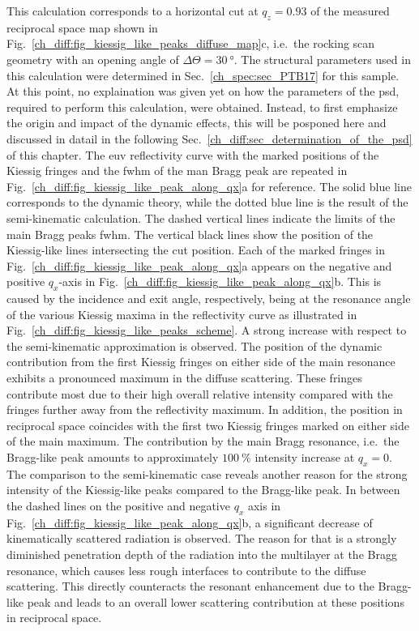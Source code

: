 This calculation corresponds to a horizontal cut at $q_z=0.93$ of the measured reciprocal space map shown in Fig.~\ref{ch_diff:fig_kiessig_like_peaks_diffuse_map}c, i.e.~the rocking scan geometry with an opening angle of $\Delta \Theta = \SI{30}{\degree}$. The structural parameters used in this calculation were determined in Sec.~\ref{ch_spec:sec_PTB17} for this sample. At this point, no explaination was given yet on how the parameters of the \gls{psd}, required to perform this calculation, were obtained. Instead, to first emphasize the origin and impact of the dynamic effects, this will be posponed here and discussed in datail in the following Sec.~\ref{ch_diff:sec_determination_of_the_psd} of this chapter. The \gls{euv} reflectivity curve with the marked positions of the Kiessig fringes and the \gls{fwhm} of the man Bragg peak are repeated in Fig.~\ref{ch_diff:fig_kiessig_like_peak_along_qx}a for reference.
The solid blue line corresponds to the dynamic theory, while the dotted blue line is the result of the semi-kinematic calculation. The dashed vertical lines indicate the limits of the main Bragg peaks \gls{fwhm}. The vertical black lines show the position of the Kiessig-like lines intersecting the cut position. Each of the marked fringes in Fig.~\ref{ch_diff:fig_kiessig_like_peak_along_qx}a appears on the negative and positive $q_x$-axis in Fig.~\ref{ch_diff:fig_kiessig_like_peak_along_qx}b. This is caused by the incidence and exit angle, respectively, being at the resonance angle of the various Kiessig maxima in the reflectivity curve as illustrated in Fig.~\ref{ch_diff:fig_kiessig_like_peaks_scheme}. A strong increase with respect to the semi-kinematic approximation is observed. The position of the dynamic contribution from the first 
Kiessig fringes on either side of the main resonance exhibits a pronounced maximum in the diffuse scattering. These fringes contribute most due to their high overall relative 
intensity compared with the fringes further away from the reflectivity maximum. In addition, the position in reciprocal space coincides with the first two Kiessig fringes marked on either side of the main maximum. The contribution by the main Bragg resonance, i.e.~the Bragg-like peak amounts to approximately $\SI{100}{\percent}$ intensity increase at $q_x=0$. The comparison to the semi-kinematic case reveals another reason for the strong intensity of the Kiessig-like peaks compared to the Bragg-like peak. In between the dashed lines on the positive and negative $q_x$ axis in Fig.~\ref{ch_diff:fig_kiessig_like_peak_along_qx}b, a significant decrease of kinematically scattered radiation is observed. The reason for that is a strongly diminished penetration depth of the radiation into the multilayer at the Bragg resonance, which causes less rough interfaces to contribute to the diffuse scattering. This directly counteracts the resonant enhancement due to the Bragg-like peak and leads to an overall lower scattering contribution at these positions in reciprocal space.

